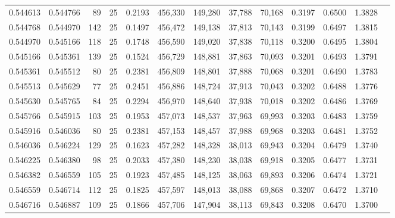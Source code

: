\begin{tabular}{rrrrrrrrrrrrr}
0.544613 & 0.544766 &    89 &  25 &                                     0.2193 & 456,330 & 149,280 &  37,788 &  70,168 & 0.3197 & 0.6500 & 1.3828 \\
0.544768 & 0.544970 &   142 &  25 &                                     0.1497 & 456,472 & 149,138 &  37,813 &  70,143 & 0.3199 & 0.6497 & 1.3815 \\
0.544970 & 0.545166 &   118 &  25 &                                     0.1748 & 456,590 & 149,020 &  37,838 &  70,118 & 0.3200 & 0.6495 & 1.3804 \\
0.545166 & 0.545361 &   139 &  25 &                                     0.1524 & 456,729 & 148,881 &  37,863 &  70,093 & 0.3201 & 0.6493 & 1.3791 \\
0.545361 & 0.545512 &    80 &  25 &                                     0.2381 & 456,809 & 148,801 &  37,888 &  70,068 & 0.3201 & 0.6490 & 1.3783 \\
0.545513 & 0.545629 &    77 &  25 &                                     0.2451 & 456,886 & 148,724 &  37,913 &  70,043 & 0.3202 & 0.6488 & 1.3776 \\
0.545630 & 0.545765 &    84 &  25 &                                     0.2294 & 456,970 & 148,640 &  37,938 &  70,018 & 0.3202 & 0.6486 & 1.3769 \\
0.545766 & 0.545915 &   103 &  25 &                                     0.1953 & 457,073 & 148,537 &  37,963 &  69,993 & 0.3203 & 0.6483 & 1.3759 \\
0.545916 & 0.546036 &    80 &  25 &                                     0.2381 & 457,153 & 148,457 &  37,988 &  69,968 & 0.3203 & 0.6481 & 1.3752 \\
0.546036 & 0.546224 &   129 &  25 &                                     0.1623 & 457,282 & 148,328 &  38,013 &  69,943 & 0.3204 & 0.6479 & 1.3740 \\
0.546225 & 0.546380 &    98 &  25 &                                     0.2033 & 457,380 & 148,230 &  38,038 &  69,918 & 0.3205 & 0.6477 & 1.3731 \\
0.546382 & 0.546559 &   105 &  25 &                                     0.1923 & 457,485 & 148,125 &  38,063 &  69,893 & 0.3206 & 0.6474 & 1.3721 \\
0.546559 & 0.546714 &   112 &  25 &                                     0.1825 & 457,597 & 148,013 &  38,088 &  69,868 & 0.3207 & 0.6472 & 1.3710 \\
0.546716 & 0.546887 &   109 &  25 &                                     0.1866 & 457,706 & 147,904 &  38,113 &  69,843 & 0.3208 & 0.6470 & 1.3700 \\

\end{tabular}
